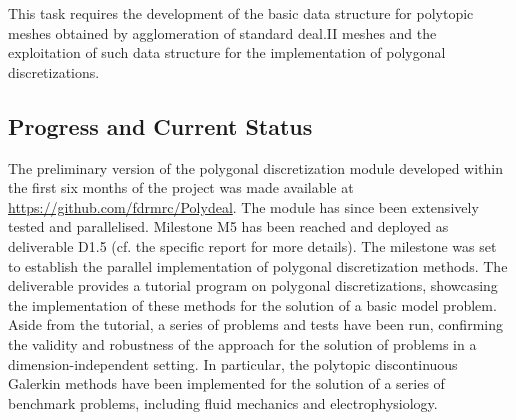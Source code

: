 \documentclass[a4paper,12pt]{article}
\begin{document}
This task requires the development of the basic data structure for polytopic meshes obtained by agglomeration of standard deal.II meshes and the exploitation of such data structure for the implementation of polygonal discretizations.


 \subsection{Progress and Current Status}

The preliminary version of the polygonal discretization module developed within the first six months of the project was made available at \url{https://github.com/fdrmrc/Polydeal}.
The module has since been extensively tested and parallelised. 
Milestone M5 has been reached and deployed as deliverable D1.5 (cf. the specific report for more details). The milestone was set to establish the parallel implementation of polygonal discretization methods. The deliverable provides a tutorial program on polygonal discretizations, showcasing the implementation of these methods for the solution of a basic model problem. Aside from the tutorial, a series of problems and tests have been run, confirming the validity and robustness of the approach for the solution of problems in a dimension-independent setting. In particular, the polytopic discontinuous Galerkin methods have been implemented for the solution of a series of benchmark problems, including fluid mechanics and electrophysiology.
\end{document}
